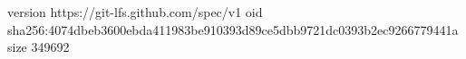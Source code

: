 version https://git-lfs.github.com/spec/v1
oid sha256:4074dbeb3600ebda411983be910393d89ce5dbb9721dc0393b2ec9266779441a
size 349692
